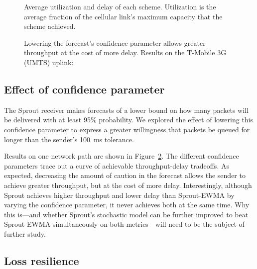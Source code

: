 \begin{figure}
\caption{Average utilization and delay of each scheme. Utilization is
  the average fraction of the cellular link's maximum capacity that
  the scheme achieved.}

\vspace{\baselineskip}

\def\svgwidth{\columnwidth}

\label{f:codelchart}

\end{figure}

\begin{figure}
\caption{Lowering the forecast's confidence parameter allows greater
  throughput at the cost of more delay. Results on the T-Mobile 3G (UMTS)
  uplink:}

\vspace{\baselineskip}

\footnotesize
\def\svgwidth{\columnwidth}

\label{f:varysprout}

\end{figure}

\subsection{Effect of confidence parameter}

The Sprout receiver makes forecasts of a lower bound on how many
packets will be delivered with at least 95\% probability. We explored
the effect of lowering this confidence parameter to express a greater
willingness that packets be queued for longer than the sender's 100~ms
tolerance.

Results on one network path are shown in
Figure~\ref{f:varysprout}. The different confidence parameters trace
out a curve of achievable throughput-delay tradeoffs. As expected,
decreasing the amount of caution in the forecast allows the sender to
achieve greater throughput, but at the cost of more delay.
Interestingly, although Sprout achieves higher throughput and lower
delay than Sprout-EWMA by varying the confidence parameter, it never
achieves both at the same time. Why this is---and whether Sprout's
stochastic model can be further improved to beat Sprout-EWMA
simultaneously on both metrics---will need to be the subject of
further study.

\subsection{Loss resilience}
\label{ss:loss}

